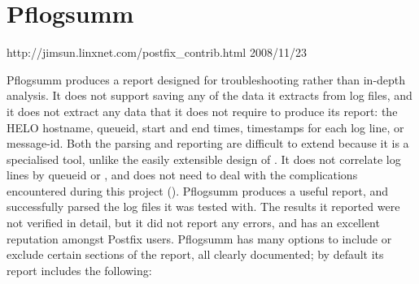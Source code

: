 %

\section{Pflogsumm}

{http://jimsun.linxnet.com/postfix_contrib.html}
{2008/11/23}

Pflogsumm produces a report designed for troubleshooting rather than
in-depth analysis.  It does not support saving any of the data it extracts
from log files, and it does not extract any data that it does not require
to produce its report: the HELO hostname, queueid, start and end times,
timestamps for each log line, or message-id.  Both the parsing and
reporting are difficult to extend because it is a specialised tool, unlike
the easily extensible design of \parsername{}.  It does not correlate log
lines by queueid or , and does not need to deal with the
complications encountered during this project ().
Pflogsumm produces a useful report, and successfully parsed the
\numberOFlogFILES{} log files it was tested with.  The results it reported
were not verified in detail, but it did not report any errors, and has an
excellent reputation amongst Postfix users.  Pflogsumm has many options to
include or exclude certain sections of the report, all clearly documented;
by default its report includes the following:

